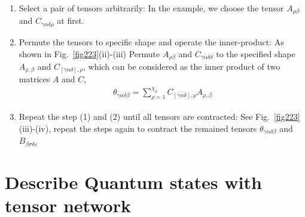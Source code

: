 \begin{enumerate}

	\item Select a pair of tensors arbitrarily: In the example, we choose the tensor $A_{\rho \beta}$ and $C_{\gamma \alpha \delta \rho}$ at first. 
	\item Permute the tensors to specific shape and operate the inner-product: As shown in Fig.~\ref{fig223}(ii)-(iii) Permute $A_{\rho \beta}$ and $C_{\gamma \alpha \delta \delta}$ to the specified shape $A_{\rho, \beta}$ and $C_{[\gamma \alpha \delta], \rho}$, which can be considered as the inner product of two matrices $A$ and $C$, 
		\begin{align}
			\theta_{\gamma \alpha \delta \beta} = \sum_{\rho = 1}^{\chi_{\rho}}{C_{[\gamma \alpha \delta], \rho} A_{\rho, \beta}}
		\end{align}
	\item Repeat the step (1) and (2) until all tensors are contracted: See Fig.~\ref{fig223}(iii)-(iv), repeat the steps again to contract the remained tensors $\theta_{\gamma \alpha \delta \beta}$ and $B_{\beta \sigma \delta \varepsilon}$
\end{enumerate}

\section{Describe Quantum states with tensor network} %
\label{sub:map2quan}

